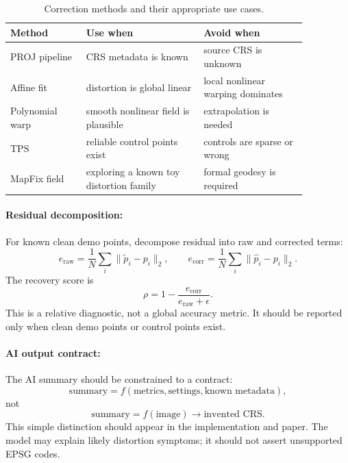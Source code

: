 \documentclass{article}
\begin{document}
\begin{table}[t]
\centering
\caption{Correction methods and their appropriate use cases.}
\begin{tabular}{@{}p{0.22\linewidth}p{0.34\linewidth}p{0.30\linewidth}@{}}
\toprule
\textbf{Method} & \textbf{Use when} & \textbf{Avoid when}\\
\midrule
PROJ pipeline & CRS metadata is known & source CRS is unknown\\
Affine fit & distortion is global linear & local nonlinear warping dominates\\
Polynomial warp & smooth nonlinear field is plausible & extrapolation is needed\\
TPS & reliable control points exist & controls are sparse or wrong\\
MapFix field & exploring a known toy distortion family & formal geodesy is required\\
\bottomrule
\end{tabular}
\end{table}

\paragraph{Residual decomposition:}

For known clean demo points, decompose residual into raw and corrected terms:
\begin{equation}
  e_{\text{raw}}=\frac{1}{N}\sum_i\|\tilde{p}_i-p_i\|_2,\qquad
  e_{\text{corr}}=\frac{1}{N}\sum_i\|\hat{p}_i-p_i\|_2.
\end{equation}
The recovery score is
\begin{equation}
  \rho=1-\frac{e_{\text{corr}}}{e_{\text{raw}}+\epsilon}.
\end{equation}
This is a relative diagnostic, not a global accuracy metric. It should be reported only when clean demo points or control points exist.

\paragraph{AI output contract:}

The AI summary should be constrained to a contract:
\begin{equation}
  \text{summary}=f(\text{metrics},\text{settings},\text{known metadata}),
\end{equation}
not
\begin{equation}
  \text{summary}=f(\text{image})\rightarrow\text{invented CRS}.
\end{equation}
This simple distinction should appear in the implementation and paper. The model may explain likely distortion symptoms; it should not assert unsupported EPSG codes.
\end{document}
